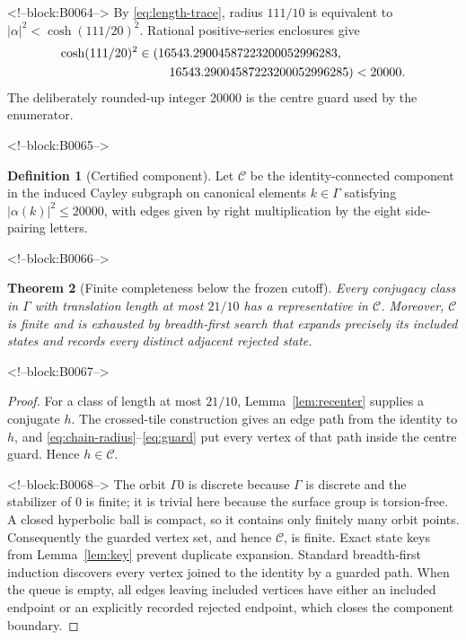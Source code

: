 \documentclass[11pt,a4paper]{article}
\newtheorem{theorem}{Theorem}[section]
\theoremstyle{definition}
\newtheorem{definition}[theorem]{Definition}
\begin{document}
<!--block:B0064-->
By \eqref{eq:length-trace}, radius \(111/10\) is equivalent to
\(|\alpha|^2<\cosh(111/20)^2\).  Rational positive-series enclosures give
\begin{equation}\label{eq:guard}
\begin{aligned}
 \cosh(111/20)^2
 &\in(16543.29004587223200052996283,\\
 &\hspace{2.5em}16543.29004587223200052996285)<20000.
\end{aligned}
\end{equation}
The deliberately rounded-up integer 20000 is the centre guard used by the
enumerator.

<!--block:B0065-->
\begin{definition}[Certified component]
Let \(\mathcal C\) be the identity-connected component in the induced Cayley
subgraph on canonical elements \(k\in\Gamma\) satisfying
\(|\alpha(k)|^2\leq20000\), with edges given by right multiplication by the
eight side-pairing letters.
\end{definition}

<!--block:B0066-->
\begin{theorem}[Finite completeness below the frozen cutoff]
\label{thm:complete}
Every conjugacy class in \(\Gamma\) with translation length at most \(21/10\)
has a representative in \(\mathcal C\).  Moreover, \(\mathcal C\) is finite
and is exhausted by breadth-first search that expands precisely its included
states and records every distinct adjacent rejected state.
\end{theorem}

<!--block:B0067-->
\begin{proof}
For a class of length at most \(21/10\), Lemma~\ref{lem:recenter} supplies a
conjugate \(h\).  The crossed-tile construction gives an edge path from the
identity to \(h\), and \eqref{eq:chain-radius}--\eqref{eq:guard} put every
vertex of that path inside the centre guard.  Hence \(h\in\mathcal C\).

<!--block:B0068-->
The orbit \(\Gamma0\) is discrete because \(\Gamma\) is discrete and the
stabilizer of \(0\) is finite; it is trivial here because the surface group is
torsion-free.  A closed hyperbolic ball is compact, so it contains only
finitely many orbit points.  Consequently the guarded vertex set, and hence
\(\mathcal C\), is finite.  Exact state keys from Lemma~\ref{lem:key} prevent
duplicate expansion.  Standard breadth-first induction discovers every
vertex joined to the identity by a guarded path.  When the queue is empty,
all edges leaving included vertices have either an included endpoint or an
explicitly recorded rejected endpoint, which closes the component boundary.
\end{proof}
\end{document}
